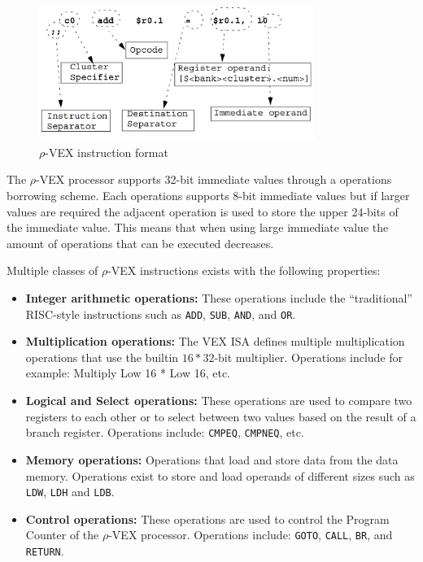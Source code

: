 \begin{figure}[ht!]
\centering
\includegraphics[width=0.8\textwidth]{2_background/img/Instructions.png}
\caption{$\rho$-VEX instruction format}
\label{fig:rvex_asm}
\end{figure}

The $\rho$-VEX processor supports 32-bit immediate values through a operations borrowing scheme. Each operations supports 8-bit immediate values but if larger values are required the adjacent operation is used to store the upper 24-bits of the immediate value. This means that when using large immediate value the amount of operations that can be executed decreases.

Multiple classes of $\rho$-VEX instructions exists with the following properties:

\begin{itemize}
  \item \textbf{Integer arithmetic operations:} These operations include the “traditional” RISC-style instructions such as \texttt{ADD}, \texttt{SUB}, \texttt{AND}, and \texttt{OR}. 
  \item \textbf{Multiplication operations:} The VEX ISA defines multiple multiplication operations that use the builtin $16*32$-bit multiplier. Operations include for example: Multiply Low 16 * Low 16, etc. 
  \item \textbf{Logical and Select operations:} These operations are used to compare two registers to each other or to select between two values based on the result of a branch register. Operations include: \texttt{CMPEQ}, \texttt{CMPNEQ}, etc.
  \item \textbf{Memory operations:} Operations that load and store data from the data memory. Operations exist to store and load operands of different sizes such as \texttt{LDW}, \texttt{LDH} and \texttt{LDB}.
  \item \textbf{Control operations:} These operations are used to control the Program Counter of the $\rho$-VEX processor. Operations include: \texttt{GOTO}, \texttt{CALL}, \texttt{BR}, and \texttt{RETURN}.
\end{itemize}

